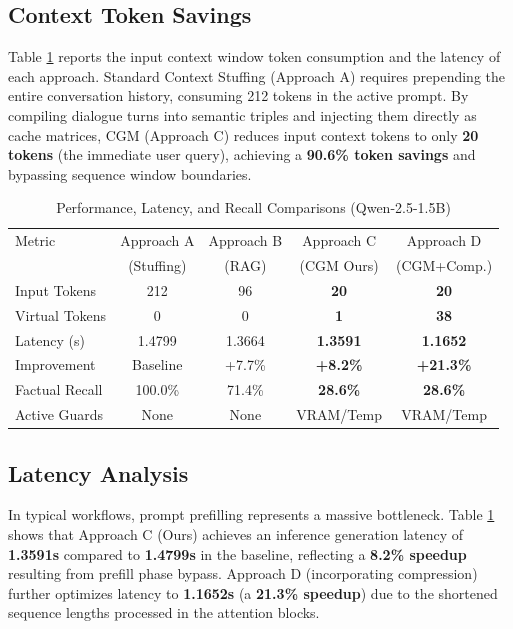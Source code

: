 \documentclass[conference]{IEEEtran}
\begin{document}
\subsection{Context Token Savings}
Table \ref{tab:results} reports the input context window token consumption and the latency of each approach. Standard Context Stuffing (Approach A) requires prepending the entire conversation history, consuming 212 tokens in the active prompt. By compiling dialogue turns into semantic triples and injecting them directly as cache matrices, CGM (Approach C) reduces input context tokens to only \textbf{20 tokens} (the immediate user query), achieving a \textbf{90.6\% token savings} and bypassing sequence window boundaries.

\begin{table}[h]
\centering
\caption{Performance, Latency, and Recall Comparisons (Qwen-2.5-1.5B)}
\label{tab:results}
\begin{tabular}{lcccc}
\toprule
Metric & Approach A & Approach B & Approach C & Approach D \\
& (Stuffing) & (RAG) & (CGM Ours) & (CGM+Comp.) \\
\midrule
Input Tokens & 212 & 96 & \textbf{20} & \textbf{20} \\
Virtual Tokens & 0 & 0 & \textbf{1} & \textbf{38} \\
Latency (s) & 1.4799 & 1.3664 & \textbf{1.3591} & \textbf{1.1652} \\
Improvement & Baseline & +7.7\% & \textbf{+8.2\%} & \textbf{+21.3\%} \\
Factual Recall & 100.0\% & 71.4\% & \textbf{28.6\%} & \textbf{28.6\%} \\
Active Guards & None & None & VRAM/Temp & VRAM/Temp \\
\bottomrule
\end{tabular}
\end{table}

\subsection{Latency Analysis}
In typical workflows, prompt prefilling represents a massive bottleneck. Table \ref{tab:results} shows that Approach C (Ours) achieves an inference generation latency of \textbf{1.3591s} compared to \textbf{1.4799s} in the baseline, reflecting a \textbf{8.2\% speedup} resulting from prefill phase bypass. Approach D (incorporating compression) further optimizes latency to \textbf{1.1652s} (a \textbf{21.3\% speedup}) due to the shortened sequence lengths processed in the attention blocks.
\end{document}
